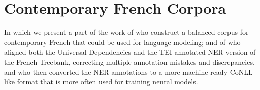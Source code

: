 \chapter{Contemporary French Corpora}

\begin{center}
    \begin{minipage}{0.66\textwidth}
        \begin{small}
            In which we present a part of the work of \citet{popa-fabre-etal-2020-french} who construct a balanced corpus for contemporary French that could be used for language modeling; and of \citet{ortiz-suarez-etal-2020-establishing} who aligned both the Universal Dependencies and the TEI-annotated NER version of the French Treebank, correcting multiple annotation mistakes and discrepancies, and who then converted the NER annotations to a more machine-ready CoNLL-like format that is more often used for training neural models.
        \end{small}
    \end{minipage}
    \vspace{0.5cm}
\end{center}

